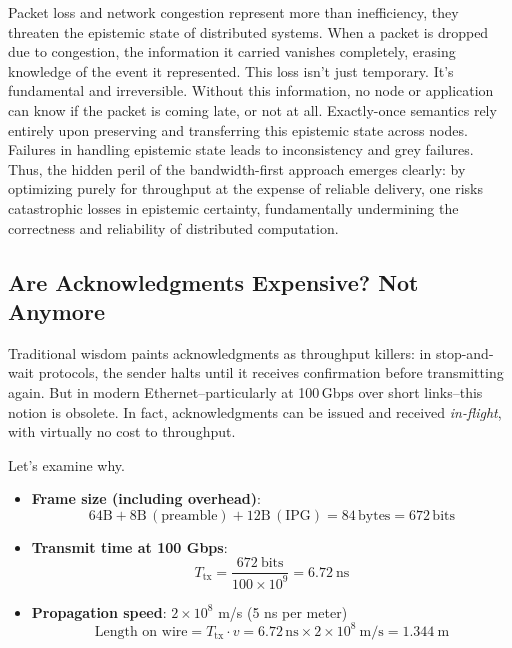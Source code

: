 \documentclass[../../../OAE-SPEC-MAIN.tex]{subfiles}
\begin{document}
Packet loss and network congestion represent more than inefficiency, they threaten the epistemic state of distributed systems. When a packet is dropped due to congestion, the information it carried vanishes completely, erasing knowledge of the event it represented. This loss isn't just temporary. It's fundamental and irreversible. Without this information, no node or application can know if the packet is coming late, or not at all. Exactly-once semantics rely entirely upon preserving and transferring this epistemic state across nodes. Failures in handling epistemic state leads to inconsistency and grey failures. Thus, the hidden peril of the bandwidth-first approach emerges clearly: by optimizing purely for throughput at the expense of reliable delivery, one risks catastrophic losses in epistemic certainty, fundamentally undermining the correctness and reliability of distributed computation.


\subsection{Are Acknowledgments Expensive? Not Anymore}

Traditional wisdom paints acknowledgments as throughput killers: in stop-and-wait protocols, the sender halts until it receives confirmation before transmitting again. But in modern Ethernet--particularly at 100\,Gbps over short links--this notion is obsolete. In fact, acknowledgments can be issued and received \emph{in-flight}, with virtually no cost to throughput.

Let’s examine why.

\begin{itemize}
  \item \textbf{Frame size (including overhead)}:
  \[
  64\text{B} + 8\text{B}\,(\text{preamble}) + 12\text{B}\,(\text{IPG}) = 84\,\text{bytes} = 672\,\text{bits}
  \]
  \item \textbf{Transmit time at 100 Gbps}:
  \[
  T_{\text{tx}} = \frac{672\ \text{bits}}{100 \times 10^9} = 6.72\ \text{ns}
  \]
  \item \textbf{Propagation speed}: \(2 \times 10^8\) m/s (5 ns per meter)
  \[
  \text{Length on wire} = T_{\text{tx}} \cdot v = 6.72\,\text{ns} \times 2 \times 10^8\ \text{m/s} = 1.344\ \text{m}
  \]
\end{itemize}
\vspace{1em}
\end{document}
